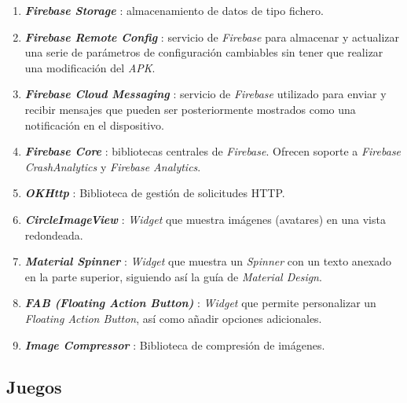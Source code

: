 \documentclass[twoside]{report}
\begin{document}
\begin{enumerate}
\item \textbf{\textit{Firebase Storage}} \cite{fstoragedependencies}: almacenamiento de datos de tipo fichero.

\item \textbf{\textit{Firebase Remote Config}} \cite{fremoteconfigdependencies}: servicio de \textit{Firebase} para almacenar y actualizar una serie de parámetros de configuración cambiables sin tener que realizar una modificación del \textit{APK}.

\item \textbf{\textit{Firebase Cloud Messaging}} \cite{fcmessagingdependencies}: servicio de \textit{Firebase} utilizado para enviar y recibir mensajes que pueden ser posteriormente mostrados como una notificación en el dispositivo.

\item \textbf{\textit{Firebase Core}} \cite{fcanalyticsdependencies}: bibliotecas centrales de \textit{Firebase}. Ofrecen soporte a \textit{Firebase CrashAnalytics} y \textit{Firebase Analytics}.

\item \textbf{\textit{OKHttp}} \cite{okhttpdependencies}: Biblioteca de gestión de solicitudes HTTP.

\item \textbf{\textit{CircleImageView}} \cite{circleimagevdependencies}: \textit{Widget} que muestra imágenes (avatares) en una vista redondeada.

\item \textbf{\textit{Material Spinner}} \cite{materialspinnerdependencies}: \textit{Widget} que muestra un \textit{Spinner} con un texto anexado en la parte superior, siguiendo así la guía de \textit{Material Design}.

\item \textbf{\textit{FAB (Floating Action Button)}} \cite{fabdependencies}: \textit{Widget} que permite personalizar un \textit{Floating Action Button}, así como añadir opciones adicionales.

\item \textbf{\textit{Image Compressor}} \cite{icompressordependencies}: Biblioteca de compresión de imágenes.

\end{enumerate}

\subsection{Juegos}
\end{document}
